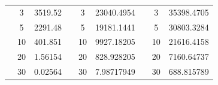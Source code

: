 \begin{table}[h]
\begin{tabular}{|cclcclccl|}
\rowcolor[HTML]{DAE8FC} 
\multicolumn{1}{|c|}{\cellcolor[HTML]{FFFFC7}}                                & \multicolumn{1}{c|}{\cellcolor[HTML]{DAE8FC}3}         & \multicolumn{1}{l|}{\cellcolor[HTML]{DAE8FC}3519.52}    & \multicolumn{1}{c|}{\cellcolor[HTML]{FFFFC7}}                                & \multicolumn{1}{c|}{\cellcolor[HTML]{DAE8FC}3}         & \multicolumn{1}{l|}{\cellcolor[HTML]{DAE8FC}23040.4954} & \multicolumn{1}{c|}{\cellcolor[HTML]{FFFFC7}}                                & \multicolumn{1}{c|}{\cellcolor[HTML]{DAE8FC}3}         & 35398.4705 \\ \cline{2-3} \cline{5-6} \cline{8-9} 
\rowcolor[HTML]{DDFDFF} 
\multicolumn{1}{|c|}{\cellcolor[HTML]{FFFFC7}}                                & \multicolumn{1}{c|}{\cellcolor[HTML]{DDFDFF}5}         & \multicolumn{1}{l|}{\cellcolor[HTML]{DDFDFF}2291.48}    & \multicolumn{1}{c|}{\cellcolor[HTML]{FFFFC7}}                                & \multicolumn{1}{c|}{\cellcolor[HTML]{DDFDFF}5}         & \multicolumn{1}{l|}{\cellcolor[HTML]{DDFDFF}19181.1441} & \multicolumn{1}{c|}{\cellcolor[HTML]{FFFFC7}}                                & \multicolumn{1}{c|}{\cellcolor[HTML]{DDFDFF}5}         & 30803.3284 \\ \cline{2-3} \cline{5-6} \cline{8-9} 
\rowcolor[HTML]{DAE8FC} 
\multicolumn{1}{|c|}{\cellcolor[HTML]{FFFFC7}}                                & \multicolumn{1}{c|}{\cellcolor[HTML]{DAE8FC}10}        & \multicolumn{1}{l|}{\cellcolor[HTML]{DAE8FC}401.851}    & \multicolumn{1}{c|}{\cellcolor[HTML]{FFFFC7}}                                & \multicolumn{1}{c|}{\cellcolor[HTML]{DAE8FC}10}        & \multicolumn{1}{l|}{\cellcolor[HTML]{DAE8FC}9927.18205} & \multicolumn{1}{c|}{\cellcolor[HTML]{FFFFC7}}                                & \multicolumn{1}{c|}{\cellcolor[HTML]{DAE8FC}10}        & 21616.4158 \\ \cline{2-3} \cline{5-6} \cline{8-9} 
\rowcolor[HTML]{DDFDFF} 
\multicolumn{1}{|c|}{\cellcolor[HTML]{FFFFC7}}                                & \multicolumn{1}{c|}{\cellcolor[HTML]{DDFDFF}20}        & \multicolumn{1}{l|}{\cellcolor[HTML]{DDFDFF}1.56154}    & \multicolumn{1}{c|}{\cellcolor[HTML]{FFFFC7}}                                & \multicolumn{1}{c|}{\cellcolor[HTML]{DDFDFF}20}        & \multicolumn{1}{l|}{\cellcolor[HTML]{DDFDFF}828.928205} & \multicolumn{1}{c|}{\cellcolor[HTML]{FFFFC7}}                                & \multicolumn{1}{c|}{\cellcolor[HTML]{DDFDFF}20}        & 7160.64737 \\ \cline{2-3} \cline{5-6} \cline{8-9} 
\rowcolor[HTML]{DAE8FC} 
\multicolumn{1}{|c|}{\cellcolor[HTML]{FFFFC7}}                                & \multicolumn{1}{c|}{\cellcolor[HTML]{DAE8FC}30}        & \multicolumn{1}{l|}{\cellcolor[HTML]{DAE8FC}0.02564}    & \multicolumn{1}{c|}{\cellcolor[HTML]{FFFFC7}}                                & \multicolumn{1}{c|}{\cellcolor[HTML]{DAE8FC}30}        & \multicolumn{1}{l|}{\cellcolor[HTML]{DAE8FC}7.98717949} & \multicolumn{1}{c|}{\cellcolor[HTML]{FFFFC7}}                                & \multicolumn{1}{c|}{\cellcolor[HTML]{DAE8FC}30}        & 688.815789 \\ \cline{2-3} \cline{5-6} \cline{8-9} 

\end{tabular}
\end{table}
